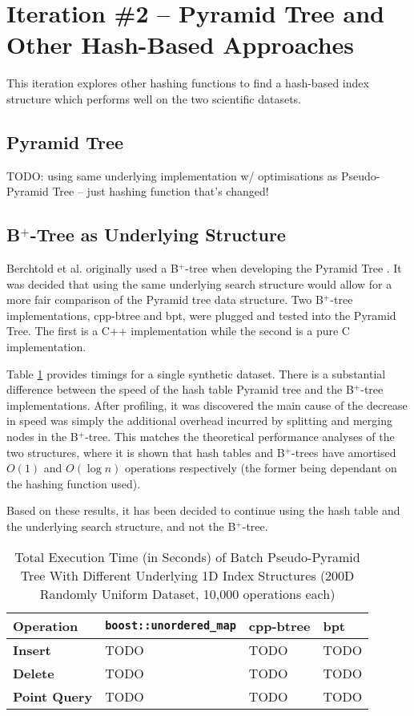 \section{Iteration \#2 -- Pyramid Tree and Other Hash-Based Approaches}

This iteration explores other hashing functions to find a hash-based index structure which performs well on the two scientific datasets.

\subsection{Pyramid Tree}

TODO: using same underlying implementation w/ optimisations as Pseudo-Pyramid Tree -- just hashing function that's changed!

\subsection{B${}^+$-Tree as Underlying Structure}

Berchtold et al. originally used a B${}^{+}$-tree when developing the Pyramid Tree \cite{pyramid-tree}. It was decided that using the same underlying search structure would allow for a more fair comparison of the Pyramid tree data structure. Two B${}^{+}$-tree implementations, cpp-btree\cite{cpp-btree} and bpt\cite{bpt}, were plugged and tested into the Pyramid Tree. The first is a C++ implementation while the second is a pure C implementation.

Table \ref{tab:hashtable-bplus-time-comparison} provides timings for a single synthetic dataset. There is a substantial difference between the speed of the hash table Pyramid tree and the B${}^{+}$-tree implementations. After profiling, it was discovered the main cause of the decrease in speed was simply the additional overhead incurred by splitting and merging nodes in the B${}^{+}$-tree. This matches the theoretical performance analyses of the two structures, where it is shown that hash tables and B${}^{+}$-trees have amortised $O(1)$ and $O(\log n)$ operations respectively (the former being dependant on the hashing function used).

Based on these results, it has been decided to continue using the hash table and the underlying search structure, and not the B${}^{+}$-tree.

\begin{table}
	\centering
	\begin{tabular}{|l|l|l|l|}
		\hline
		\textbf{Operation} & \texttt{boost::unordered\_map} & cpp-btree & bpt \\
		\hline
		\textbf{Insert} & TODO & TODO & TODO \\
		\textbf{Delete} & TODO & TODO & TODO \\
		\textbf{Point Query} & TODO & TODO & TODO \\
		\hline
	\end{tabular}
	\caption{Total Execution Time (in Seconds) of Batch Pseudo-Pyramid Tree With Different Underlying 1D Index Structures (200D Randomly Uniform Dataset, 10,000 operations each)}
	\label{tab:hashtable-bplus-time-comparison}
\end{table}

